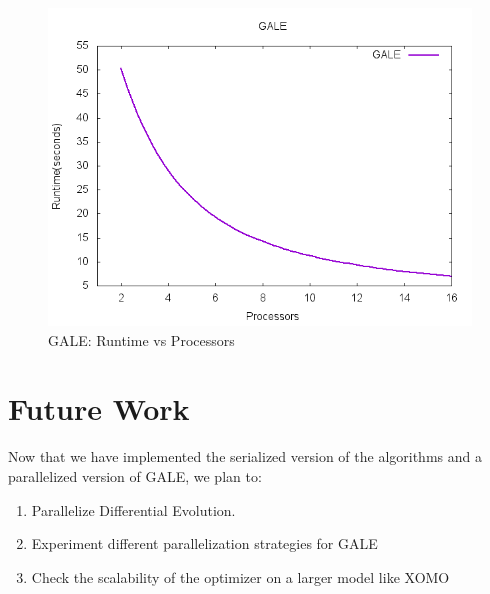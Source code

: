 \documentclass[conference]{IEEEtran}
\begin{document}
\begin{figure}[h]
\begin{mdframed}
\includegraphics[width=\linewidth]{img/gale_processors}
\end{mdframed}
\caption{GALE: Runtime vs Processors}	
\label{fig:gale_runtime}
\end{figure}

\section{Future Work}
\label{future}

Now that we have implemented the serialized version of the algorithms and a parallelized version of GALE, we plan to:
\begin{enumerate}
\item Parallelize Differential Evolution.
\item Experiment different parallelization strategies for GALE
\item Check the scalability of the optimizer on a larger model like XOMO\cite{menzies05xomo}
\end{enumerate}
\newpage


\end{document}
